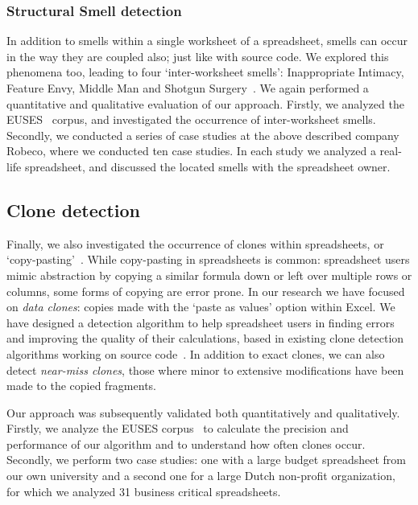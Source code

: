 \documentclass[conference]{IEEEtran}
\begin{document}
\subsubsection{Structural Smell detection}
In addition to smells within a single worksheet of a spreadsheet, smells can occur in the way they are coupled also; just like with source code. We explored this phenomena too, leading to four `inter-worksheet smells': Inappropriate Intimacy, Feature Envy, Middle Man and Shotgun Surgery~\cite{hermans_detecting_2012-1}. We again performed a quantitative and qualitative evaluation of our approach. Firstly, we analyzed the EUSES~\cite{fisher_euses_2005} corpus, and investigated the occurrence of inter-worksheet smells. Secondly, we conducted a series of case studies at the above described company Robeco, where we conducted ten case studies. In each study we analyzed a real-life spreadsheet, and discussed the located smells with the spreadsheet owner.  

\subsection{Clone detection}
Finally, we also investigated the occurrence of clones within spreadsheets, or `copy-pasting'~\cite{hermans_data_2013}. While copy-pasting in spreadsheets is common: spreadsheet users mimic abstraction by copying a similar formula down or left over multiple rows or columns, some forms of copying are error prone. In our research we have focused on \emph{data clones}: copies made with the `paste as values' option within Excel. We have designed a detection algorithm to help spreadsheet users in finding errors and improving the quality of their calculations, based in existing clone detection algorithms working on source code~\cite{DBLP:conf/cascon/Johnson93}. In addition to exact clones, we can also detect \emph{near-miss clones}, those where minor to extensive modifications have been made to the copied fragments\cite{DBLP:conf/icsm/Roy09}.

Our approach was subsequently validated both quantitatively and qualitatively. Firstly, we analyze the EUSES corpus~\cite{fisher_euses_2005} to calculate the precision and performance of our algorithm and to understand how often clones occur. 
Secondly, we perform two case studies: one with a large budget spreadsheet from our own university and a second one for a large Dutch non-profit organization, for which we analyzed 31 business critical spreadsheets.
\end{document}
